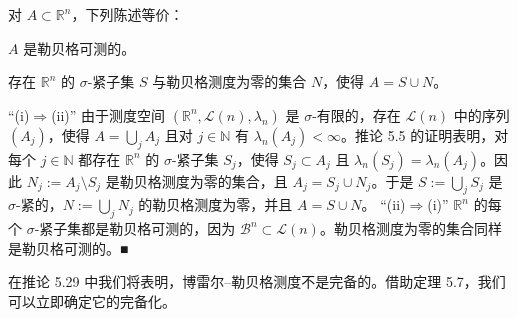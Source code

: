 \begin{theorem}

对 $ A \subset \mathbb{R}^n $，下列陈述等价：

\begin{subitems}
\item

$ A $ 是勒贝格可测的。

\item

存在 $ \mathbb{R}^n $ 的 $ \sigma $-紧子集 $ S $ 与勒贝格测度为零的集合 $ N $，使得 $ A = S \cup N $。

\proofhead
“(i)$ \Rightarrow $(ii)” 由于测度空间 $ (\mathbb{R}^n, \mathcal{L}(n), \lambda_n) $ 是 $ \sigma $-有限的，存在 $ \mathcal{L}(n) $ 中的序列 $ (A_j) $，使得 $ A = \bigcup_j A_j $ 且对 $ j \in \mathbb{N} $ 有 $ \lambda_n(A_j) < \infty $。推论 5.5 的证明表明，对每个 $ j \in \mathbb{N} $ 都存在 $ \mathbb{R}^n $ 的 $ \sigma $-紧子集 $ S_j $，使得 $ S_j \subset A_j $ 且 $ \lambda_n(S_j) = \lambda_n(A_j) $。因此 $ N_j := A_j \setminus S_j $ 是勒贝格测度为零的集合，且 $ A_j = S_j \cup N_j $。于是 $ S := \bigcup_j S_j $ 是 $ \sigma $-紧的，$ N := \bigcup_j N_j $ 的勒贝格测度为零，并且 $ A = S \cup N $。
“(ii)$ \Rightarrow $(i)” $ \mathbb{R}^n $ 的每个 $ \sigma $-紧子集都是勒贝格可测的，因为 $ \mathcal{B}^n \subset \mathcal{L}(n) $。勒贝格测度为零的集合同样是勒贝格可测的。\nobreak\hspace{0.35em}■
\end{subitems}

\end{theorem}

在推论 5.29 中我们将表明，博雷尔–勒贝格测度不是完备的。借助定理 5.7，我们可以立即确定它的完备化。

